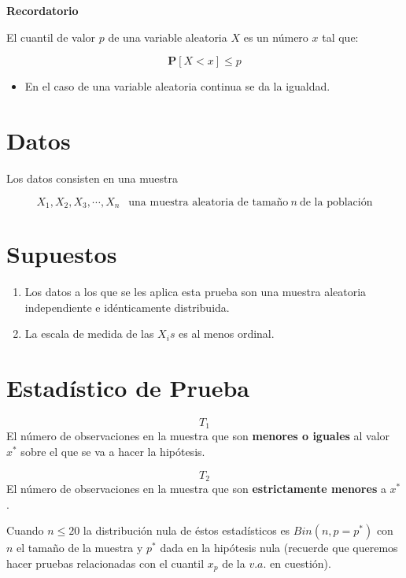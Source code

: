 \documentclass[
  a4paper,
  oneside,
  openany]{book}
\providecommand{\tightlist}{%
  \setlength{\itemsep}{0pt}\setlength{\parskip}{0pt}}
\begin{document}
\textbf{Recordatorio}

El cuantil de valor \(p\) de una variable aleatoria \(X\)
es un número \(x\) tal que:

\[ \mathbf{P}[X < x]\leq p\]

\begin{itemize}
\tightlist
\item
  En el caso de una variable aleatoria continua se da la igualdad.
\end{itemize}

\hypertarget{datos-1}{%
\section{Datos}\label{datos-1}}

Los datos consisten en una muestra

\[X_{1},X_{2},X_{3},\cdots,X_{n}  \  \ \mbox{ una muestra aleatoria de tamaño} \ n \  \mbox{de la población}\]

\hypertarget{supuestos-1}{%
\section{Supuestos}\label{supuestos-1}}

\begin{enumerate}
\def\labelenumi{\arabic{enumi})}
\item
  Los datos a los que se les aplica esta prueba son una muestra aleatoria independiente e idénticamente distribuida.
\item
  La escala de medida de las \(X_{i}s\) es al menos ordinal.
\end{enumerate}

\hypertarget{estaduxedstico-de-prueba-1}{%
\section{Estadístico de Prueba}\label{estaduxedstico-de-prueba-1}}

\[T_{1}\]
El número de observaciones en la muestra que son \textbf{menores o iguales} al valor \(x^*\) sobre el que se va a hacer la hipótesis.

\[T_{2}\]
El número de observaciones en la muestra que son \textbf{estrictamente menores} a \(x^*\).

Cuando \(n\leq 20\) la distribución nula de éstos estadísticos es \(Bin(n,p=p^*)\) con \(n\) el tamaño de la muestra y \(p^*\) dada en la hipótesis nula (recuerde que queremos hacer pruebas relacionadas con el cuantil \(x_{p}\) de la \(v.a.\) en cuestión).
\end{document}
